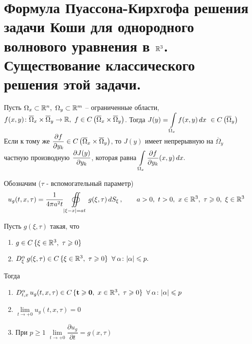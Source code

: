 \documentclass[../main.tex]{subfiles}
\begin{document}
\section[Однородное волновое уравнение в \texorpdfstring{$\R^3$}{R\textasciicircum 3}]{Формула Пуассона-Кирхгофа решения задачи Коши для однородного волнового уравнения в $\R^3$. Существование классического решения этой задачи.}
\begin{theorem}
Пусть 
$\Omega_x\subset\R^n,\ \Omega_y\subset\R^m$ -- ограниченные области,
$f(x,y)\colon \overline{\Omega}_x \times \overline{\Omega}_y \rightarrow \R,\ 
f \in C \roundBr{ \overline{\Omega}_x\times\overline{\Omega}_y }$. 
Тогда 
$J(y) = \displaystyle\int\limits_{\Omega_x} f(x,y)\, dx\ 
\in C \roundBr{ \overline{\Omega}_y }$ \\
%
Если к тому же 
$\dfrac{\partial f}{\partial y_k} 
\in C \left( \overline{\Omega}_x\times\overline{\Omega}_y \right)$, 
то $J(y)$ имеет непрерывную на $\overline{\Omega}_y$ частную производную $\dfrac{\partial J(y)}{\partial y_k}$, 
которая равна $\displaystyle\int\limits_{\Omega_x} \dfrac{\partial f}{\partial y_k} (x,y)\, dx.$
\end{theorem}


Обозначим ($\tau$ - вспомогательный параметр)
\[
u_g(t,x,\tau)=\frac{1}{4\pi a^2t}\displaystyle\oiint\limits_{|\xi - x|=at}g(\xi ,\tau )\, dS_{\xi}\, , \qquad a>0,\ t> 0,\ x\in \R^3,\ \tau \geq 0,\ \xi\in\R^3
\]

\begin{lemma}
Пусть $g(\xi, \tau )$ такая, что 
\begin{enumerate}
\item $g \in C\,\{\xi\in\mathbb{R}^3,\ \tau\geqslant 0 \}$
\item $D_{\xi}^{\alpha}\, g(\xi , \tau )\in C\,\{\xi\in\mathbb{R}^3,\ \tau\geqslant 0 \} \;\;\forall\:\alpha\colon |\alpha |\leqslant p.$
\end{enumerate}

Тогда
\begin{enumerate}

\item $D_{t,x}^{\alpha}\, u_g(t,x,\tau )
      \in C\, \{\mathbf{t\geqslant 0},\   x\in\mathbb{R}^3,\   \tau \geqslant 0 \}
      \;\;\forall\:\alpha\colon |\alpha| \leqslant p$

\item $\lim\limits_{t\rightarrow +0} u_g(t,x,\tau) = 0$

\item При $p\geq 1$ $\lim\limits_{t\rightarrow +0}\dfrac{\partial u_g}{\partial t}=g(x,\tau)$

\end{enumerate}
\end{lemma}
\end{document}

